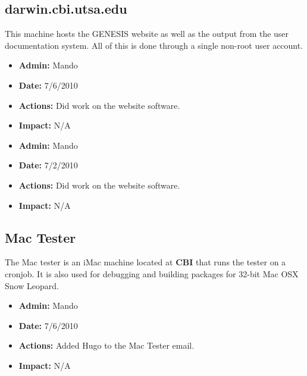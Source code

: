 \documentclass[12pt]{article}
\begin{document}
\subsection*{darwin.cbi.utsa.edu}

This machine hosts the GENESIS website as well as the output from the user documentation system. All of this is done through a single non-root user account.

\begin{itemize}
\item[] {\bf Admin:} Mando
\item[] {\bf Date:} 7/6/2010
\item[] {\bf Actions:} Did work on the website software. 
\item[] {\bf Impact:} N/A
\end{itemize}

\begin{itemize}
\item[] {\bf Admin:} Mando
\item[] {\bf Date:} 7/2/2010
\item[] {\bf Actions:} Did work on the website software. 
\item[] {\bf Impact:} N/A
\end{itemize}


\subsection*{Mac Tester}

The Mac tester is an iMac machine located at {\bf CBI} that runs the tester on a cronjob. It is also used for debugging and building packages for 32-bit Mac OSX Snow Leopard.

\begin{itemize}
\item[] {\bf Admin:} Mando
\item[] {\bf Date:} 7/6/2010
\item[] {\bf Actions:} Added Hugo to the Mac Tester email.
\item[] {\bf Impact:} N/A
\end{itemize}
\end{document}
